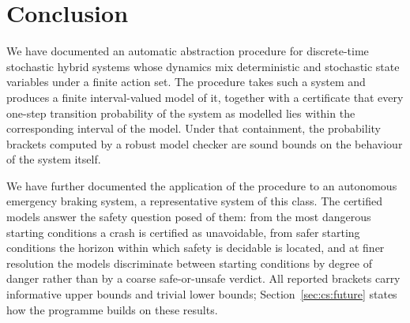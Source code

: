 \documentclass[11pt,a4paper]{article}
\theoremstyle{plain}
\theoremstyle{remark}
\begin{document}
	\section{Conclusion}
	\label{sec:concl}
	
	We have documented an automatic abstraction procedure for discrete-time stochastic hybrid systems whose dynamics mix deterministic and stochastic state variables under a finite action set. The procedure takes such a system and produces a finite interval-valued model of it, together with a certificate that every one-step transition probability of the system as modelled lies within the corresponding interval of the model. Under that containment, the probability brackets computed by a robust model checker are sound bounds on the behaviour of the system itself.
	
	We have further documented the application of the procedure to an autonomous emergency braking system, a representative system of this class. The certified models answer the safety question posed of them: from the most dangerous starting conditions a crash is certified as unavoidable, from safer starting conditions the horizon within which safety is decidable is located, and at finer resolution the models discriminate between starting conditions by degree of danger rather than by a coarse safe-or-unsafe verdict. All reported brackets carry informative upper bounds and trivial lower bounds; Section~\ref{sec:cs:future} states how the programme builds on these results.
	
	
	
\end{document}
